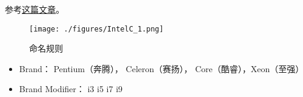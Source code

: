 
\begin{issues}
\issueDraft
\end{issues}

参考\href{https://www.itechtics.com/processor-generations/}{这篇文章}。

\begin{figure}[ht]
\centering
\texttt{[image: ./figures/IntelC\_1.png]}
\caption{命名规则} \label{IntelC_fig1}
\end{figure}

\begin{itemize}
\item Brand： Pentium（奔腾）， Celeron（赛扬）， Core（酷睿），Xeon（至强）
\item Brand Modifier： i3 i5 i7 i9
\end{itemize}

